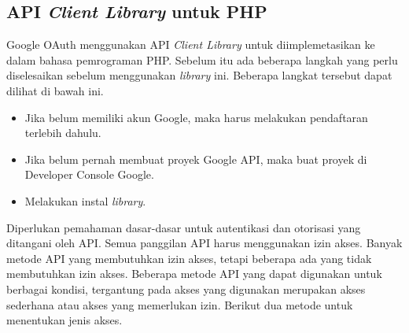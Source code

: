 \subsection{API {\it Client Library} untuk PHP \cite{Lib:2015}}
Google OAuth menggunakan API {\it Client Library} untuk diimplemetasikan ke dalam bahasa pemrograman PHP. Sebelum itu ada beberapa langkah yang perlu diselesaikan sebelum menggunakan {\it library} ini. Beberapa langkat tersebut dapat dilihat di bawah ini.

\begin{itemize}
\item Jika belum memiliki akun Google, maka harus melakukan pendaftaran terlebih dahulu.
\item Jika belum pernah membuat proyek Google API, maka buat proyek di Developer Console Google.
\item Melakukan instal {\it library}.
\end{itemize}

Diperlukan pemahaman dasar-dasar untuk autentikasi dan otorisasi yang ditangani oleh API. Semua panggilan API harus menggunakan izin akses. Banyak metode API yang membutuhkan izin akses, tetapi beberapa ada yang tidak membutuhkan izin akses. Beberapa metode API yang dapat digunakan untuk berbagai kondisi, tergantung pada akses yang digunakan merupakan akses sederhana atau akses yang memerlukan izin. Berikut dua metode untuk menentukan jenis akses.

